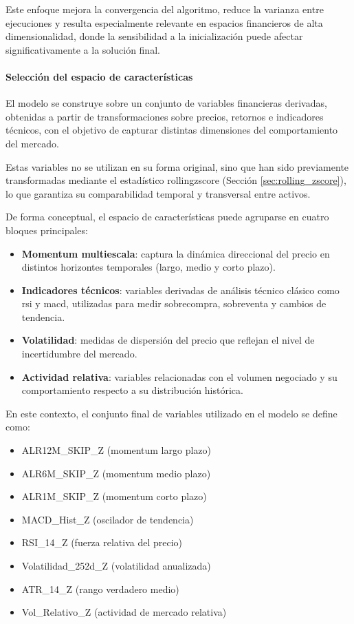 \documentclass[
]{article}
\begin{document}
Este enfoque mejora la convergencia del algoritmo, reduce la varianza entre ejecuciones y resulta especialmente relevante en espacios financieros de alta dimensionalidad, donde la sensibilidad a la inicialización puede afectar significativamente a la solución final.

\paragraph{Selección del espacio de características}

El modelo se construye sobre un conjunto de variables financieras derivadas, obtenidas a partir de transformaciones sobre precios, retornos e indicadores técnicos, con el objetivo de capturar distintas dimensiones del comportamiento del mercado.

Estas variables no se utilizan en su forma original, sino que han sido previamente transformadas mediante el estadístico \gls{rollingzscore} (Sección \ref{sec:rolling_zscore}), lo que garantiza su comparabilidad temporal y transversal entre activos.

De forma conceptual, el espacio de características puede agruparse en cuatro bloques principales:

\begin{itemize}
\item \textbf{Momentum multiescala}: captura la dinámica direccional del precio en distintos horizontes temporales (largo, medio y corto plazo).
\item \textbf{Indicadores técnicos}: variables derivadas de análisis técnico clásico como \gls{rsi} y \gls{macd}, utilizadas para medir sobrecompra, sobreventa y cambios de tendencia.
\item \textbf{Volatilidad}: medidas de dispersión del precio que reflejan el nivel de incertidumbre del mercado.
\item \textbf{Actividad relativa}: variables relacionadas con el volumen negociado y su comportamiento respecto a su distribución histórica.
\end{itemize}

En este contexto, el conjunto final de variables utilizado en el modelo se define como:

\begin{itemize}
\item ALR12M\_SKIP\_Z (momentum largo plazo)
\item ALR6M\_SKIP\_Z (momentum medio plazo)
\item ALR1M\_SKIP\_Z (momentum corto plazo)
\item MACD\_Hist\_Z (oscilador de tendencia)
\item RSI\_14\_Z (fuerza relativa del precio)
\item Volatilidad\_252d\_Z (volatilidad anualizada)
\item ATR\_14\_Z (rango verdadero medio)
\item Vol\_Relativo\_Z (actividad de mercado relativa)
\end{itemize}
\end{document}

